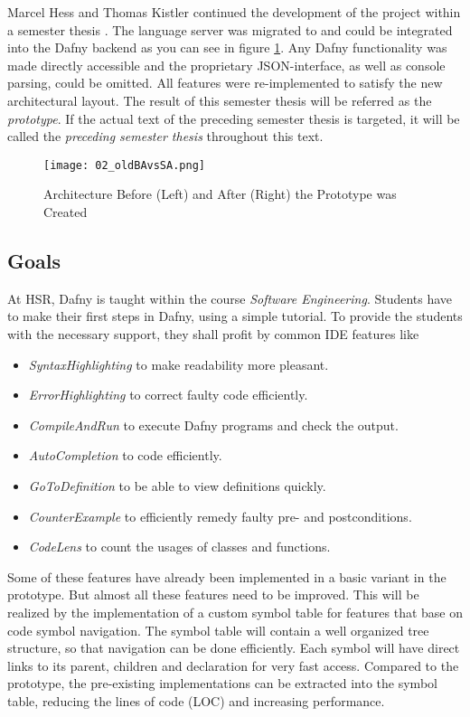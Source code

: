 Marcel Hess and Thomas Kistler continued the development of the project within a semester thesis \cite{sa}.
The language server was migrated to \CsharpWithSpace and could be integrated into the Dafny backend
as you can see in figure \ref{fig:oldBAvsSA_2}.
Any Dafny functionality was made directly accessible and the proprietary JSON-interface, as well as console parsing, could be omitted.
All features were re-implemented to satisfy the new architectural layout.
The result of this semester thesis will be referred as the \textit{prototype}. 
If the actual text of the preceding semester thesis is targeted, it will be called the \textit{preceding semester thesis} throughout this text. 

\begin{figure}[ht]
    \centering
    \texttt{[image: 02\_oldBAvsSA.png]}
    \caption{Architecture Before (Left) and After (Right) the Prototype was Created}
    \label{fig:oldBAvsSA_2}
\end{figure}

\pagebreak
\subsection{Goals}
At HSR, Dafny is taught within the course \textit{Software Engineering}.
Students have to make their first steps in Dafny, using a simple tutorial.
To provide the students with the necessary support, they shall profit by common IDE features like
\begin{itemize}
    \item \textit{SyntaxHighlighting} to make readability more pleasant.
    \item \textit{ErrorHighlighting} to correct faulty code efficiently.
    \item \textit{CompileAndRun} to execute Dafny programs and check the output.
    \item \textit{AutoCompletion} to code efficiently.
    \item \textit{GoToDefinition} to be able to view definitions quickly.
    \item \textit{CounterExample} to efficiently remedy faulty pre- and postconditions.
    \item \textit{CodeLens} to count the usages of classes and functions.
\end{itemize}

Some of these features have already been implemented in a basic variant in the prototype.
But almost all these features need to be improved.
This will be realized by the implementation of a custom symbol table for features that base on code symbol navigation.
The symbol table will contain a well organized tree structure, so that navigation can be done efficiently.
Each symbol will have direct links to its parent, children and declaration for very fast access.
Compared to the prototype, the pre-existing implementations can be extracted into the symbol table,
reducing the lines of code (LOC) and increasing performance.  \\

